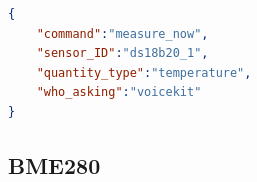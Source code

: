 \begin{itemize}
\begin{lstlisting}[language=json,firstnumber=1,caption={Structure of JSON message to command sensor to measure current data in module \textit{Sensors}},captionpos=b,xleftmargin=1cm]
{
    "command":"measure_now",
    "sensor_ID":"ds18b20_1",
    "quantity_type":"temperature",
    "who_asking":"voicekit"
}
    \end{lstlisting}
\end{itemize}


\subsection{BME280}


